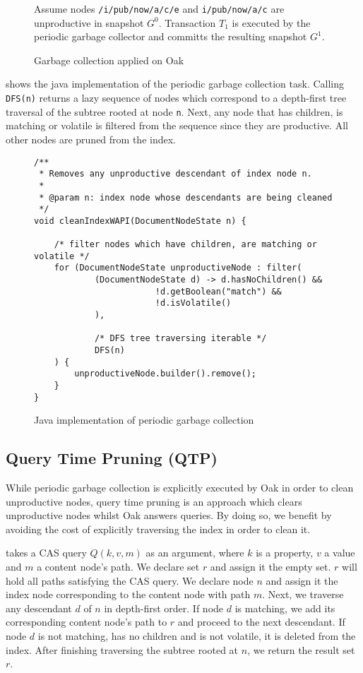 \documentclass[abstracton,12pt]{scrartcl}
\theoremstyle{definition}
\begin{document}
\begin{figure}[h]
\vspace{3mm}
\caption*{
  Assume nodes \texttt{/i/pub/now/a/c/e} and \texttt{i/pub/now/a/c} are
  unproductive in snapshot $G^0$. Transaction $T_1$ is executed by the periodic
  garbage collector and committs the resulting snapshot $G^1$.
}
\caption{Garbage collection applied on Oak}
\label{fig:periodic_gc}
\end{figure}

 shows the java implementation of the periodic
garbage collection task. Calling \texttt{DFS(n)} returns a lazy sequence of nodes
which correspond to a depth-first tree traversal of the subtree rooted at node
\texttt{n}. Next, any node that has children, is matching or volatile is
filtered from the sequence since they are productive. All other nodes are pruned
from the index.

\begin{figure}[h]
\begin{verbatim}
/**
 * Removes any unproductive descendant of index node n.
 *
 * @param n: index node whose descendants are being cleaned
 */
void cleanIndexWAPI(DocumentNodeState n) {

    /* filter nodes which have children, are matching or volatile */
    for (DocumentNodeState unproductiveNode : filter(
            (DocumentNodeState d) -> d.hasNoChildren() &&
                        !d.getBoolean("match") &&
                        !d.isVolatile()
            ),

            /* DFS tree traversing iterable */
            DFS(n)
    ) {
        unproductiveNode.builder().remove();
    }
}
\end{verbatim}
  \caption{Java implementation of periodic garbage collection}
  \label{fig:java_periodic_gc}
\end{figure}

\newpage

\subsection{Query Time Pruning (QTP)}

While periodic garbage collection is explicitly executed by Oak in order to
clean unproductive nodes, query time pruning is an approach which clears
unproductive nodes whilst Oak answers queries. By doing so, we benefit by
avoiding the cost of explicitly traversing the index in order to clean it.  

 takes a CAS query $Q(k,v,m)$ as an argument, where
$k$ is a property, $v$ a value and $m$ a content node's path. We declare set $r$
and assign it the empty set. $r$ will hold all paths satisfying the CAS query.
We declare node $n$ and assign it the index node corresponding to the content
node with path $m$. Next, we traverse any descendant $d$ of $n$ in depth-first
order. If node $d$ is matching, we add its corresponding content node's path to
$r$ and proceed to the next descendant. If node $d$ is not matching, has no
children and is not volatile, it is deleted from the index. After finishing
traversing the subtree rooted at $n$, we return the result set $r$.
\end{document}
